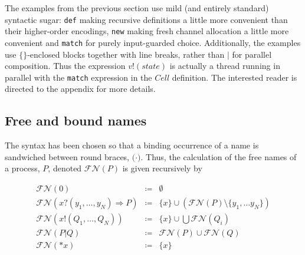 \documentclass[]{amsart}
\newcommand{\id}[1]{\texttt{#1}}
\newcommand{\pzero}{\mathbin{0}}
\newcommand{\juxtap}{\mathbin{\id{|}}}
\newcommand{\freenames}[1]{\mathbin{\mathcal{FN}(#1)}}
\newcommand{\binpar}[2]{#1 \juxtap #2}
\newcommand{\defneqls}{\coloneqq}
\newcommand{\bc}{\mathbin{\mathbf{::=}}}
\theoremstyle{definition}
\theoremstyle{remark}
\numberwithin{equation}{subsection}
\begin{document}

The examples from the previous section use mild (and entirely
standard) syntactic sugar: \texttt{def} making recursive definitions a
little more convenient than their higher-order encodings, \texttt{new}
making fresh channel allocation a little more convenient and
\texttt{match} for purely input-guarded choice. Additionally, the
examples use $\{\}$-enclosed blocks together with line breaks, rather
than $\binpar{}{}$ for parallel composition. Thus the expression $v!(
state )$ is actually a thread running in parallel with the
\texttt{match} expression in the $Cell$ definition. The interested
reader is directed to the appendix for more details.

\subsection{Free and bound names}

The syntax has been chosen so that a binding occurrence of a name is
sandwiched between round braces, ${(} \cdot {)}$. Thus, the
calculation of the free names of a process, $P$, denoted
$\freenames{P}$ is given recursively by

	\begin{eqnarray*}
		\freenames{\pzero} & \defneqls & \emptyset \\
		\freenames{{x}{?}{( y_1, \ldots, y_N )} \Rightarrow {P}} & \defneqls & \{ x \} \cup (\freenames{P} \setminus \{ y_1, \ldots y_N \}) \\
		\freenames{{x}{!}{( Q_1, \ldots, Q_N )}} & \defneqls & \{ x \} \cup \bigcup \freenames{Q_i} \\
		\freenames{\binpar{P}{Q}} & \defneqls & \freenames{P} \cup \freenames{Q} \\
		\freenames{{*}{x}} & \defneqls & \{ x \} \\
	\end{eqnarray*}
\end{document}
